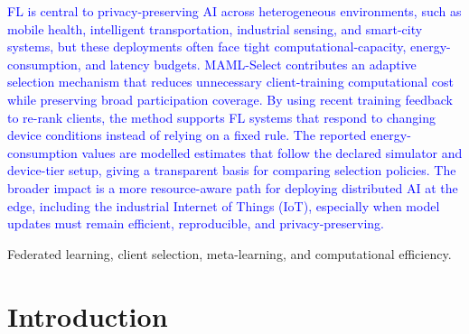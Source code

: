 \documentclass[journal]{IEEEtran}
\newcommand{\revision}[1]{\textcolor{blue}{#1}}
\begin{document}
\begin{abstract}
{After the selected clients return their updates, the same policy is meta-updated using the new feedback. We evaluate MAML-Select on Fashion-MNIST, CIFAR-10, and CIFAR-100 with 100 clients, K = 10 selected clients per round, a Dirichlet non-IID split with $\alpha=0.5$, and three random seeds. On Fashion-MNIST, CIFAR-10, and CIFAR-100, MAML-Select provides competitive accuracy with significantly lower cumulative Tera Floating-Point Operations (TFLOPs) and modelled energy consumption. Higher values of Jain-index values also demonstrates the fairness of the proposed method. %
}
\end{abstract}
\renewcommand\IEEEkeywordsname{Impact Statement}
\begin{IEEEkeywords}
\revision{FL is central to privacy-preserving AI across heterogeneous environments, such as mobile health, intelligent transportation, industrial sensing, and smart-city systems, but these deployments often face tight computational-capacity, energy-consumption, and latency budgets. MAML-Select contributes an adaptive selection mechanism that reduces unnecessary client-training computational cost while preserving broad participation coverage. By using recent training feedback to re-rank clients, the method supports FL systems that respond to changing device conditions instead of relying on a fixed rule. The reported energy-consumption values are modelled estimates that follow the declared simulator and device-tier setup, giving a transparent basis for comparing selection policies. The broader impact is a more resource-aware path for deploying distributed AI at the edge, including the industrial Internet of Things (IoT), especially when model updates must remain efficient, reproducible, and privacy-preserving.}


\end{IEEEkeywords}
\renewcommand\IEEEkeywordsname{Index Terms}
\begin{IEEEkeywords}
Federated learning, client selection, meta-learning, and computational efficiency.
\end{IEEEkeywords}
\section{Introduction}
\end{document}
